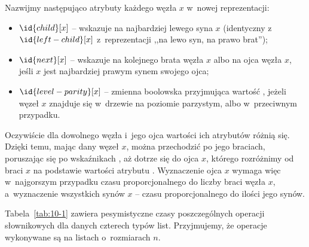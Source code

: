 Nazwijmy następująco atrybuty każdego węzła $x$ w~nowej reprezentacji:
\begin{itemize}
	\item $\id{child}[x]$ -- wskazuje na najbardziej lewego syna $x$ (identyczny z~$\id{left-child}[x]$ z~reprezentacji ,,na lewo syn, na prawo brat'');
	\item $\id{next}[x]$ -- wskazuje na kolejnego brata węzła $x$ albo na ojca węzła $x$, jeśli $x$ jest najbardziej prawym synem swojego ojca;
	\item $\id{level-parity}[x]$ -- zmienna boolowska przyjmująca wartość , jeżeli węzeł $x$ znajduje się w~drzewie na poziomie parzystym, albo  w~przeciwnym przypadku.
\end{itemize}

Oczywiście dla dowolnego węzła i~jego ojca wartości ich atrybutów  różnią się. Dzięki temu, mając dany węzeł $x$, można przechodzić po jego braciach, poruszając się po wskaźnikach , aż dotrze się do ojca $x$, którego rozróżnimy od braci $x$ na podstawie wartości atrybutu . Wyznaczenie ojca $x$ wymaga więc w~najgorszym przypadku czasu proporcjonalnego do liczby braci węzła $x$, a~wyznaczenie wszystkich synów $x$ -- czasu proporcjonalnego do ilości jego synów.

\problems

Tabela~\ref{tab:10-1} zawiera pesymistyczne czasy poszczególnych operacji słownikowych dla danych czterech typów list. Przyjmujemy, że operacje wykonywane są na listach o~rozmiarach $n$.

